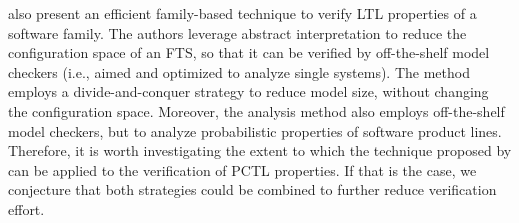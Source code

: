 \citet{Dimovski2015} also present an efficient family-based technique to verify
LTL properties of a software family.  The authors leverage abstract
interpretation to reduce the configuration space of an FTS, so that it can be
verified by off-the-shelf model checkers (i.e., aimed and optimized to analyze
single systems).  The method employs a divide-and-conquer strategy to reduce
model size, without changing the configuration space.  Moreover, the analysis
method also employs off-the-shelf model checkers, but to analyze probabilistic
properties of software product lines.  Therefore, it is worth investigating the
extent to which the technique proposed by \citet{Dimovski2015} can be applied to
the verification of PCTL properties.  If that is the case, we conjecture that
both strategies could be combined to further reduce verification effort.






